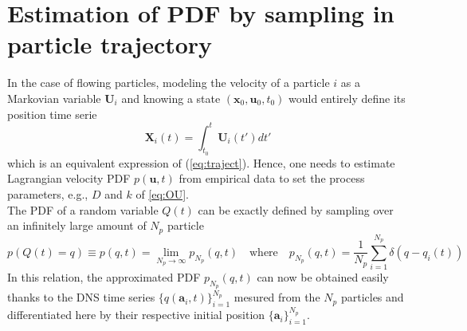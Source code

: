 \section{Estimation of PDF by sampling in particle trajectory}
In the case of flowing particles, modeling the velocity of a particle $i$ as a Markovian variable $\textbf{U}_i$ and knowing a state $(\textbf{x}_0,\textbf{u}_0,t_0)$ would entirely define its position time serie 
\[\textbf{X}_i(t)=\int_{t_0}^{t}\textbf{U}_i(t')dt'\]
which is an equivalent expression of (\ref{eq:traject}).
Hence, one needs to estimate Lagrangian velocity PDF $p(\textbf{u},t)$ from empirical data to set the process parameters, e.g., $D$ and $k$ of \eqref{eq:OU}. 
\\The PDF of a random variable $Q(t)$ can be exactly defined by sampling over an infinitely large amount of $N_p$ particle
\[
p(Q(t)=q)\equiv p(q,t)=\lim\limits_{N_p\rightarrow\infty}p_{N_p}(q,t) \quad\textrm{where}\quad p_{N_p}(q,t)=\frac{1}{N_p}\sum_{i=1}^{N_p}\delta(q-q_i(t))
\]
In this relation, the approximated PDF $p_{N_p}(q,t)$ can now be obtained easily thanks to the DNS time series $\{q(\textbf{a}_i,t)\}_{i=1}^{N_p}$ mesured from the $N_p$ particles and differentiated here by their respective initial position $\{\textbf{a}_i\}_{i=1}^{N_p}$.\\

